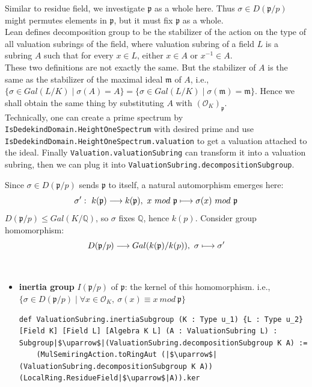 \begin{rmk} Similar to residue field, we investigate $\mathfrak{p}$ as a whole here. Thus $\sigma \in D(\mathfrak{p}/p)$ might permutes elements in $\mathfrak{p}$, but it must fix $\mathfrak{p}$ as a whole. \\Lean defines decomposition group to be the stabilizer of the action on the type of all valuation subrings of the field, where valuation subring of a field $L$ is a subring $A$ such that for every $x \in L$, either $x \in A$ or $x^{-1} \in A$. \\These two definitions are not exactly the same. But the stabilizer of $A$ is the same as the stabilizer of the maximal ideal $\mathfrak{m}$ of $A$, i.e.,
    $\{\sigma \in Gal(L/K) \mid \sigma(A) = A\} = \{\sigma \in Gal(L/K) \mid \sigma(\mathfrak{m}) = \mathfrak{m}\}$.
Hence we shall obtain the same thing by substituting $A$ with $(\mathcal{O}_K)_\mathfrak{p}$.\\
Technically, one can create a prime spectrum by \verb|IsDedekindDomain.HeightOneSpectrum| with desired prime and use \verb|IsDedekindDomain.HeightOneSpectrum.valuation| to get a valuation attached to the ideal. Finally \verb|Valuation.valuationSubring| can transform it into a valuation subring, then we can plug it into \verb|ValuationSubring.decompositionSubgroup|.
\end{rmk}
\noindent
Since $\sigma \in D({\mathfrak{p}}/p)$ sends $\mathfrak{p}$ to itself, a natural automorphism emerges here:
\begin{equation}
    \notag
    \sigma' : \ k(\mathfrak{p}) \longrightarrow k(\mathfrak{p}), \ x \ mod \ \mathfrak{p} \longmapsto \sigma(x) \ mod \ \mathfrak{p}
\end{equation}
$D({\mathfrak{p}}/p) \leq Gal(K/\mathbb{Q})$, so $\sigma$ fixes $\mathbb{Q}$, hence $k(p)$.
Consider group homomorphism:
\begin{equation}
    \notag
    D({\mathfrak{p}}/p) \longrightarrow Gal(k(\mathfrak{p}) / k(p)), \ 
    \sigma \longmapsto \sigma'
\end{equation}
\begin{defi}
~\begin{itemize}
    \item \textbf{inertia group} $I(\mathfrak{p}/p)$ of $\mathfrak{p}$: the kernel of this homomorphism. i.e., \\$\{\sigma \in D(\mathfrak{p}/p) \mid \forall x \in \mathcal{O}_K, \ \sigma(x) \equiv x \ mod \ \mathfrak{p}\}$
    \begin{listing}[!htpb]
    \begin{verbatim}
def ValuationSubring.inertiaSubgroup (K : Type u_1) {L : Type u_2} [Field K] [Field L] [Algebra K L] (A : ValuationSubring L) : Subgroup|$\uparrow$|(ValuationSubring.decompositionSubgroup K A) :=
    (MulSemiringAction.toRingAut (|$\uparrow$|(ValuationSubring.decompositionSubgroup K A)) (LocalRing.ResidueField|$\uparrow$|A)).ker
    \end{verbatim}
    \end{listing}
\end{itemize}
\end{defi}
